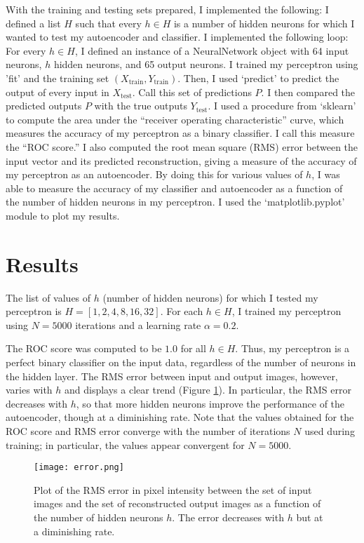 \documentclass[12pt]{article}
\newcommand{\Xtrain}{X_{\text{train}}}
\newcommand{\Ytrain}{Y_{\text{train}}}
\newcommand{\Xtest}{X_{\text{test}}}
\newcommand{\Ytest}{Y_{\text{test}}}
\begin{document}
With the training and testing sets prepared, I implemented the following: I defined a list $H$ such that every $h \in H$ is a number of hidden neurons for which I wanted to test my autoencoder and classifier. I implemented the following loop: For every $h \in H$, I defined an instance of a NeuralNetwork object with 64 input neurons, $h$ hidden neurons, and 65 output neurons. I trained my perceptron using 'fit' and the training set $(\Xtrain, \Ytrain)$. Then, I used `predict' to predict the output of every input in $\Xtest$. Call this set of predictions $P$. I then compared the predicted outputs $P$ with the true outputs $\Ytest$. I used a procedure from `sklearn' to compute the area under the ``receiver operating characteristic'' curve, which measures the accuracy of my perceptron as a binary classifier. I call this measure the ``ROC score.'' I also computed the root mean square (RMS) error between the input vector and its predicted reconstruction, giving a measure of the accuracy of my perceptron as an autoencoder. By doing this for various values of $h$, I was able to measure the accuracy of my classifier and autoencoder as a function of the number of hidden neurons in my perceptron. I used the `matplotlib.pyplot' module to plot my results.

\section{Results}

The list of values of $h$ (number of hidden neurons) for which I tested my perceptron is $H = [1,2,4,8,16,32]$. For each $h \in H$, I trained my perceptron using $N=5000$ iterations and a learning rate $\alpha=0.2$.

The ROC score was computed to be $1.0$ for all $h \in H$. Thus, my perceptron is a perfect binary classifier on the input data, regardless of the number of neurons in the hidden layer. The RMS error between input and output images, however, varies with $h$ and displays a clear trend (Figure \ref{fig:error}). In particular, the RMS error decreases with $h$, so that more hidden neurons improve the performance of the autoencoder, though at a diminishing rate. Note that the values obtained for the ROC score and RMS error converge with the number of iterations $N$ used during training; in particular, the values appear convergent for $N=5000$.

\begin{figure}[h]
\centering
\texttt{[image: error.png]}
\caption{\label{fig:error} Plot of the RMS error in pixel intensity between the set of input images and the set of reconstructed output images as a function of the number of hidden neurons $h$. The error decreases with $h$ but at a diminishing rate.}
\end{figure}
\end{document}
